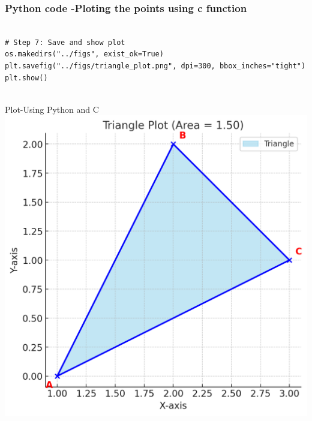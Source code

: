 \documentclass{beamer}
\begin{document}
	
\begin{frame}[fragile]                              
	\frametitle{Python code -Ploting the points using c function}
		\begin{lstlisting}

# Step 7: Save and show plot
os.makedirs("../figs", exist_ok=True)
plt.savefig("../figs/triangle_plot.png", dpi=300, bbox_inches="tight")
plt.show()
	
\end{lstlisting}                               
\end{frame}

\begin{frame}{Plot-Using  Python and C}
    \centering
    \includegraphics[width=\columnwidth, height=0.8\textheight, keepaspectratio]{../figs/triangle_plot1.png}     
\end{frame}

	
\end{document}
